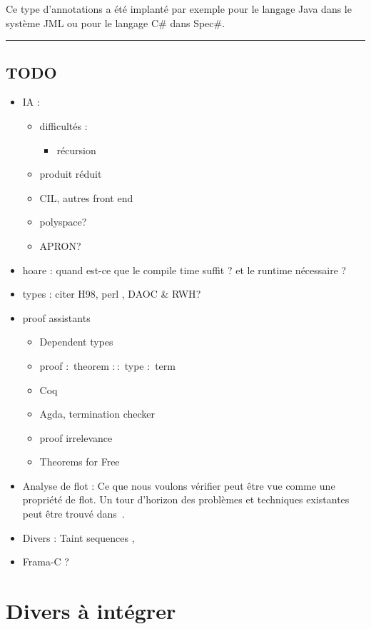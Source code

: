 Ce type d'annotations a été implanté par exemple pour le langage Java dans le
système JML\cite{jmlkluwer} ou pour le langage C\# dans Spec\#\cite{krml136}.

\begin{center}\rule{3in}{0.4pt}\end{center}

\clearpage

\subsection*{TODO}

\begin{itemize}
\item IA :
\begin{itemize}
\item difficultés :

\begin{itemize}
\item
  récursion
\end{itemize}

\item produit réduit
\item CIL, autres front end
\item polyspace?
\item APRON?
\end{itemize}

\item
  hoare : quand est-ce que le compile time suffit ? et le runtime nécessaire ?
\item
  types : citer H98\cite{haskell98}, perl \cite{perlCamelBook}, DAOC\cite{DAOC}
  \& RWH\cite{rwh}?
\item proof assistants
  \begin{itemize}
  \item Dependent types
  \item proof $:$ theorem $::$ type $:$ term
  \item Coq
  \item Agda, termination checker
  \item proof irrelevance
  \item Theorems for Free\cite{theoremsforfree}
  \end{itemize}

\item
  Analyse de flot :
Ce que nous voulons vérifier peut être vue comme une propriété de flot. Un tour
d'horizon des problèmes et techniques existantes peut être trouvé
dans~\cite{sm-jsac03}.

\item Divers : Taint sequences \cite{mdv10},
\item Frama-C ?
\end{itemize}

\section*{Divers à intégrer}

\cite{jfp92}
\cite{popl94}
\cite{ToTa1993}

